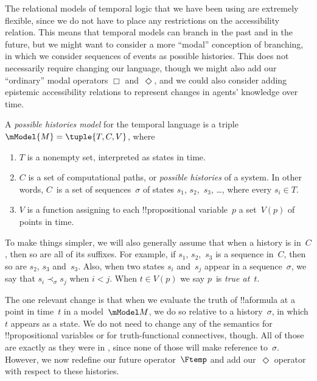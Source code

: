 \documentclass[../../../include/open-logic-section]{subfiles}
\begin{document}


The relational models of temporal logic that we have been using are
extremely flexible, since we do not have to place any restrictions on
the accessibility relation. This means that temporal models can branch
in the past and in the future, but we might want to consider a more
``modal'' conception of branching, in which we consider sequences of
events as possible histories. This does not necessarily require
changing our language, though we might also add our ``ordinary'' modal
operators $\Box$ and~$\Diamond$, and we could also consider adding
epistemic accessibility relations to represent changes in agents'
knowledge over time.

\begin{defn}
  A \emph{possible histories model} for the temporal language is a triple
  $\mModel{M} = \tuple{T, C, V}$, where
  \begin{enumerate}
    \item $T$ is a nonempty set, interpreted as states in time.
    \item $C$ is a set of computational paths, or \emph{possible
      histories} of a system. In other words, $C$~is a set of
      sequences~$\sigma$ of states $s_1$, $s_2$,~$s_3$, \dots, where
      every $s_i \in T$.
    \item $V$ is a function assigning to each !!{propositional
      variable}~$p$ a set~$V(p)$ of points in time.
  \end{enumerate}
  To make things simpler, we will also generally assume that when a
  history is in~$C$, then so are all of its suffixes. For example, if
  $s_1$, $s_2$,~$s_3$ is a sequence in~$C$, then so are $s_2$, $s_3$
  and~$s_3$. Also, when two states $s_i$ and~$s_j$ appear in a
  sequence~$\sigma$, we say that $s_i \prec_\sigma s_j$ when $i < j$.
  When $t \in V(p)$ we say $p$~is \emph{true at}~$t$.
\end{defn}

The one relevant change is that when we evaluate the truth of
!!a{formula} at a point in time~$t$ in a model~$\mModel M$, we do so
relative to a history~$\sigma$, in which $t$ appears as a state. We do
not need to change any of the semantics for !!{propositional
variable}s or for truth-functional connectives, though. All of those
are exactly as they were in , since none of
those will make reference to~$\sigma$. However, we now redefine our
future operator~$\Ftemp$ and add our~$\Diamond$ operator with respect
to these histories. 
\end{document}
